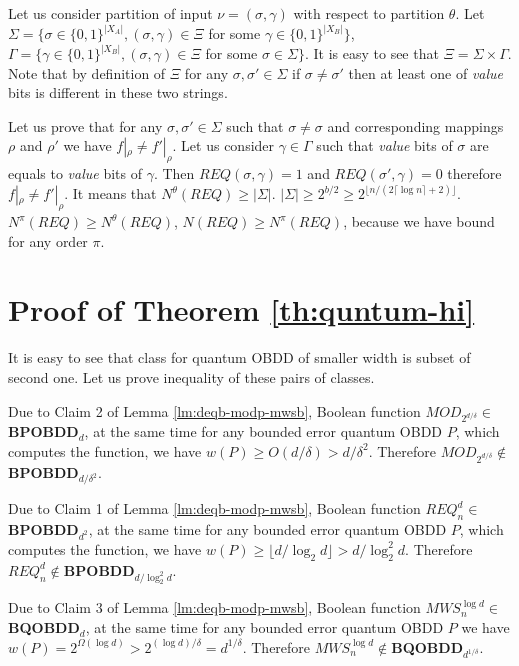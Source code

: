 \documentclass{llncs}
\begin{document}
Let us consider partition of input $\nu =(\sigma,\gamma)$ with respect to partition $\theta$. Let $\Sigma=\{\sigma\in\{0,1\}^{|X_A|}, (\sigma,\gamma)\in \Xi$ for some $\gamma\in\{0,1\}^{|X_B|}\}$, $\Gamma=\{\gamma\in\{0,1\}^{|X_B|}, (\sigma,\gamma)\in \Xi$ for some $\sigma\in\Sigma\}$. It is easy to see that $\Xi = \Sigma \times \Gamma$. Note that by definition of $\Xi$ for any $\sigma,\sigma'\in \Sigma$ if $\sigma\neq\sigma'$ then at least one of {\em value} bits is different in  these two strings.

Let us prove that for any $\sigma,\sigma'\in\Sigma$ such that $\sigma\neq\sigma$ and corresponding mappings $\rho$ and $\rho'$ we have $f|_\rho\neq f'|_\rho$. Let us consider $\gamma\in\Gamma$ such that {\em value} bits of $\sigma $ are equals to {\em value} bits of $\gamma$. Then $REQ(\sigma,\gamma)=1$ and $REQ(\sigma',\gamma)=0$ therefore $f|_\rho\neq f'|_\rho$. It means that $N^{\theta}(REQ)\geq |\Sigma|$. $|\Sigma|\geq 2^{b/2}\geq 2^{\lfloor n/(2\lceil \log n \rceil +2) \rfloor}$. $N^{\pi}(REQ)\geq N^{\theta}(REQ)$, $N(REQ)\geq N^{\pi}(REQ)$, because we have bound for any order $\pi$.
\section{Proof of Theorem \ref{th:quntum-hi}}\label{apx:prob-quant-hi}


It is easy to see that class for quantum OBDD of smaller width is subset of second one. Let us prove inequality of these pairs of classes.

 Due to Claim 2 of Lemma \ref{lm:deqb-modp-mwsb}, Boolean function $MOD_{2^{d/\delta}}\in${\bf BPOBDD}$_{d}$, at the same time for any bounded error quantum OBDD $P$, which computes the function, we have $w(P)\geq  O(d/\delta) >d/\delta^2$. Therefore $MOD_{2^{d/\delta}}\not\in${\bf BPOBDD}$_{d/\delta^2}$.

Due to Claim 1 of Lemma \ref{lm:deqb-modp-mwsb}, Boolean function $REQ_n^{d}\in${\bf BPOBDD}$_{d^2}$, at the same time for any bounded error quantum OBDD $P$, which computes the function, we have $w(P)\geq \lfloor d/\log_2 d \rfloor>d/\log^2_2 d$. Therefore $REQ_n^{d}\not\in${\bf BPOBDD}$_{d/\log^2_2 d}$.

Due to Claim 3 of Lemma \ref{lm:deqb-modp-mwsb}, Boolean function $MWS_n^{\log d}\in${\bf BQOBDD}$_d$, at the same time for any bounded error quantum OBDD $P$ we have $w(P)=2^{\Omega(\log d)}>2^{(\log d)/\delta}=d^{1/\delta}$. Therefore $MWS_n^{\log d}\not\in${\bf BQOBDD}$_{d^{1/\delta}}$.
\end{document}
